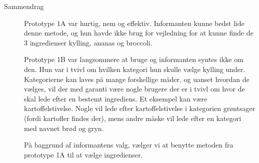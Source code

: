 \begin{description}
\item[Sammendrag] Prototype 1A var hurtig, nem og effektiv. Informanten kunne bedst lide denne metode, og hun havde ikke brug for vejledning for at kunne finde de 3 ingredienser kylling, ananas og broccoli.

Prototype 1B var langsommere at bruge og informanten syntes ikke om den. Hun var i tvivl om hvilken kategori hun skulle vælge kylling under. Kategorierne kan laves på mange forskellige måder, og uanset hvordan de vælges, vil der med garanti være nogle brugere der er i tvivl om hvor de skal lede efter en bestemt ingrediens. Et eksempel kan være kartoffelstivelse. Nogle vil lede efter kartoffelstivelse i kategorien grøntsager (fordi kartofler findes der), mens andre måske vil lede efter en kategori med navnet brød og gryn.

På baggrund af informantens valg, vælger vi at benytte metoden fra prototype 1A til at vælge ingredienser.
\end{description}

